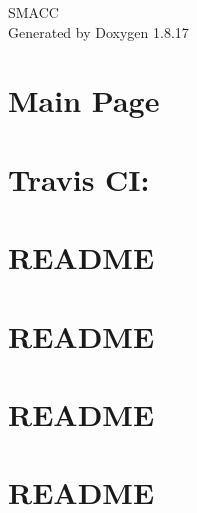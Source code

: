 \let\mypdfximage\pdfximage\def\pdfximage{\immediate\mypdfximage}\documentclass[twoside]{book}
\newcommand{\+}{\discretionary{\mbox{\scriptsize$\hookleftarrow$}}{}{}}
\newcommand{\clearemptydoublepage}{%
  \newpage{\pagestyle{empty}\cleardoublepage}%
}
\begin{document}
\hypersetup{pageanchor=false,
             bookmarksnumbered=true,
             pdfencoding=unicode
            }
\begin{titlepage}
\vspace*{7cm}
\begin{center}%
{\Large S\+M\+A\+CC }\\
\vspace*{1cm}
{\large Generated by Doxygen 1.8.17}\\
\end{center}
\end{titlepage}
\clearemptydoublepage
{}
\tableofcontents
\clearemptydoublepage
{}
\hypersetup{pageanchor=true}

\chapter{Main Page}
\label{index}\hypertarget{index}{}
\chapter{Travis CI\+:}
\label{md_README}

\chapter{R\+E\+A\+D\+ME}
\label{md_smacc_client_library_battery_monitor_client_README}

\chapter{R\+E\+A\+D\+ME}
\label{md_smacc_client_library_keyboard_client_README}

\chapter{R\+E\+A\+D\+ME}
\label{md_smacc_client_library_move_base_z_client_README}

\chapter{R\+E\+A\+D\+ME}
\label{md_smacc_client_library_multirole_sensor_client_README}

\end{document}
